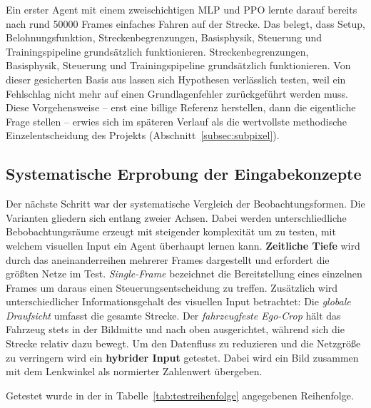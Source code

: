 Ein erster Agent mit einem zweischichtigen \ac{MLP} und \ac{PPO} lernte darauf bereits nach rund \num{50000} Frames einfaches Fahren auf der Strecke. Das belegt, dass Setup, Belohnungsfunktion, Streckenbegrenzungen, Basisphysik, Steuerung und Trainingspipeline grundsätzlich funktionieren.
Streckenbegrenzungen, Basisphysik, Steuerung und Trainingspipeline grundsätzlich funktionieren. Von dieser gesicherten Basis aus lassen sich Hypothesen verlässlich testen, weil ein Fehlschlag nicht mehr auf einen Grundlagenfehler zurückgeführt werden muss. Diese Vorgehensweise -- erst eine billige Referenz herstellen, dann die eigentliche Frage stellen -- erwies sich im späteren Verlauf als die wertvollste methodische Einzelentscheidung des Projekts (Abschnitt~\ref{subsec:subpixel}).

\subsection{Systematische Erprobung der Eingabekonzepte}
\label{subsubsec:eingabekonzepte}

Der nächste Schritt war der systematische Vergleich der Beobachtungsformen. Die Varianten gliedern sich entlang zweier Achsen.
Dabei werden unterschliedliche Bebobachtungsräume erzeugt mit steigender komplexität um zu testen, mit welchem visuellen Input ein Agent überhaupt lernen kann. \textbf{Zeitliche Tiefe} wird durch das aneinanderreihen mehrerer Frames dargestellt und erfordert die größten Netze im Test. \emph{Single-Frame} bezeichnet die Bereitstellung eines einzelnen Frames um daraus einen Steuerungsentscheidung zu treffen. Zusätzlich wird unterschiedlicher Informationsgehalt des visuellen Input betrachtet: Die \emph{globale Draufsicht} umfasst die gesamte Strecke. Der \emph{fahrzeugfeste Ego-Crop} hält das Fahrzeug stets in der Bildmitte und nach oben ausgerichtet, während sich die Strecke relativ dazu bewegt.
Um den Datenfluss zu reduzieren und die Netzgröße zu verringern wird ein \textbf{hybrider Input} getestet. Dabei wird ein Bild zusammen mit dem Lenkwinkel als normierter Zahlenwert übergeben.

Getestet wurde in der in Tabelle~\ref{tab:testreihenfolge} angegebenen Reihenfolge.

